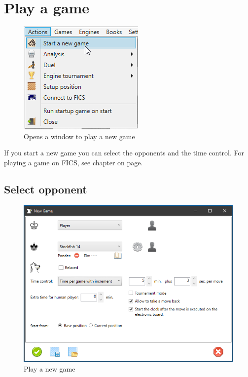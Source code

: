 \documentclass[11pt,a4paper]{article}
\begin{document}
\section{Play a game}

\begin{figure}[H]
	\centering
	\includegraphics[scale=1.0]{NewGame1.png}
	\caption{Opens a window to play a new game}
	\label{fig:NewGame1}
\end{figure}

If you start a new game you can select the opponents and the time control. For playing a game on FICS, see chapter on page.

\subsection{Select opponent} \label{SelectOpponent}

\begin{figure}[H]
	\centering
	\includegraphics[scale=0.8]{NewGame2.png}
	\caption{Play a new game}
	\label{fig:NewGame2}
\end{figure}
\end{document}
